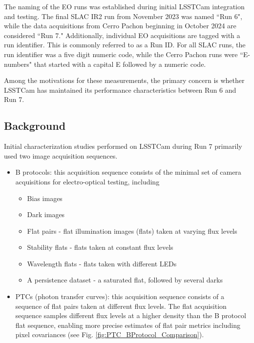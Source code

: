 The naming of the EO runs was established during initial LSSTCam
integration and testing. The final SLAC IR2 run from November 2023 was
named ``Run 6", while the data acquisitions from Cerro Pachon beginning in October 2024 are
considered ``Run 7." Additionally, individual EO acquisitions are tagged
with a run identifier. This is commonly referred to as a Run ID. For all
SLAC runs, the run identifier was a five digit numeric code, while the
Cerro Pachon runs were ``E-numbers" that started with a capital E
followed by a numeric code.

Among the motivations for these measurements, the primary concern is whether LSSTCam has
maintained its performance characteristics between Run 6 and Run 7.

\subsection{Background}\label{background}

Initial characterization studies performed on LSSTCam during Run 7 primarily used two
image acquisition sequences.

\begin{itemize}
\tightlist
\item
  B protocols: this acquisition sequence consists of the minimal set of
  camera acquisitions for electro-optical testing, including

  \begin{itemize}
  \tightlist
  \item
    Bias images
  \item
    Dark images
  \item
    Flat pairs - flat illumination images (flats) taken at varying flux levels
  \item
    Stability flats - flats taken at constant flux levels
  \item
    Wavelength flats - flats taken with different LEDs
  \item
    A persistence dataset - a saturated flat, followed by several darks
  \end{itemize}
\item
  PTCs (photon transfer curves): this acquisition sequence consists of a
  sequence of flat pairs taken at different flux levels. The flat
  acquisition sequence samples different flux levels at a higher density
  than the B protocol flat sequence, enabling more precise estimates of
  flat pair metrics including pixel covariances (see Fig. \ref{fig:PTC_BProtocol_Comparison}).
\end{itemize}

